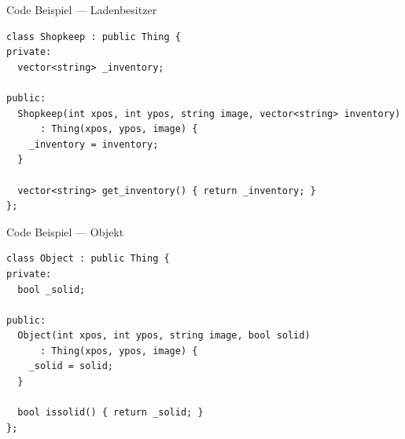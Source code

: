 \documentclass[presentation]{beamer}
\begin{document}
\begin{frame}[fragile,label={sec:orgdf1d39a}]{Code Beispiel --- Ladenbesitzer}
 \begin{verbatim}
class Shopkeep : public Thing {
private:
  vector<string> _inventory;

public:
  Shopkeep(int xpos, int ypos, string image, vector<string> inventory)
      : Thing(xpos, ypos, image) {
    _inventory = inventory;
  }

  vector<string> get_inventory() { return _inventory; }
};
\end{verbatim}
\end{frame}
\begin{frame}[fragile,label={sec:org915f723}]{Code Beispiel --- Objekt}
 \begin{verbatim}
class Object : public Thing {
private:
  bool _solid;

public:
  Object(int xpos, int ypos, string image, bool solid)
      : Thing(xpos, ypos, image) {
    _solid = solid;
  }

  bool issolid() { return _solid; }
};
\end{verbatim}
\end{frame}
\end{document}
